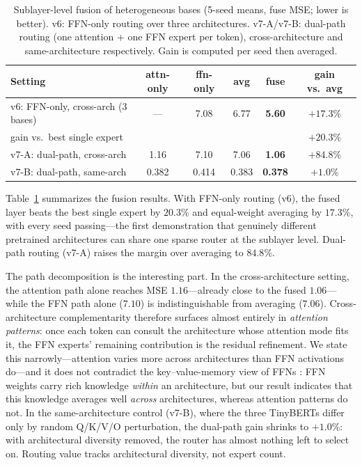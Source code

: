 \documentclass[10pt,twoside]{article}
\theoremstyle{definition}
\begin{document}
\begin{table}[t]
\centering
\caption{Sublayer-level fusion of heterogeneous bases (5-seed means, fuse MSE; lower is better). v6: FFN-only routing over three architectures. v7-A/v7-B: dual-path routing (one attention + one FFN expert per token), cross-architecture and same-architecture respectively. Gain is computed per seed then averaged.}
\label{tab:fusion}
\small
\setlength{\tabcolsep}{4.5pt}
\begin{tabular}{lccccc}
\toprule
\textbf{Setting} & \textbf{attn-only} & \textbf{ffn-only} & \textbf{avg} & \textbf{fuse} & \textbf{gain vs.\ avg} \\
\midrule
v6: FFN-only, cross-arch (3 bases) & --- & 7.08 & 6.77 & \textbf{5.60} & $+17.3\%$ \\
\quad gain vs.\ best single expert & & & & & $+20.3\%$ \\
v7-A: dual-path, cross-arch & 1.16 & 7.10 & 7.06 & \textbf{1.06} & $+84.8\%$ \\
v7-B: dual-path, same-arch & 0.382 & 0.414 & 0.383 & \textbf{0.378} & $+1.0\%$ \\
\bottomrule
\end{tabular}
\end{table}

Table~\ref{tab:fusion} summarizes the fusion results. With FFN-only routing (v6), the fused layer beats the best single expert by $20.3\%$ and equal-weight averaging by $17.3\%$, with every seed passing---the first demonstration that genuinely different pretrained architectures can share one sparse router at the sublayer level. Dual-path routing (v7-A) raises the margin over averaging to $84.8\%$.

The path decomposition is the interesting part. In the cross-architecture setting, the attention path alone reaches MSE $1.16$---already close to the fused $1.06$---while the FFN path alone ($7.10$) is indistinguishable from averaging ($7.06$). Cross-architecture complementarity therefore surfaces almost entirely in \emph{attention patterns}: once each token can consult the architecture whose attention mode fits it, the FFN experts' remaining contribution is the residual refinement. We state this narrowly---attention varies more across architectures than FFN activations do---and it does not contradict the key--value-memory view of FFNs \citep{geva2021,meng2022,dai2022}: FFN weights carry rich knowledge \emph{within} an architecture, but our result indicates that this knowledge averages well \emph{across} architectures, whereas attention patterns do not. In the same-architecture control (v7-B), where the three TinyBERTs differ only by random Q/K/V/O perturbation, the dual-path gain shrinks to $+1.0\%$: with architectural diversity removed, the router has almost nothing left to select on. Routing value tracks architectural diversity, not expert count.
\end{document}
